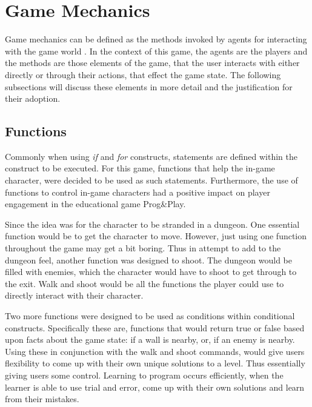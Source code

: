 \documentclass[a4paper,11.5pt]{report}
\numberwithin{figure}{section}
\numberwithin{table}{section}
\numberwithin{equation}{section}
\numberwithin{equation}{section}
\begin{document}
\section{Game Mechanics} %




Game mechanics can be defined as the methods invoked by agents for interacting with the game world \citep{sicart2008}. In the context of this game, the agents are the players and the methods are those elements of the game, that the user interacts with either directly or through their actions, that effect the game state. The following subsections will discuss these elements in more detail and the justification for their adoption.

\subsection{Functions}

Commonly when using \textit{if} and \textit{for} constructs, statements are defined within the construct to be executed. For this game, functions that help the in-game character, were decided to be used as such statements. Furthermore, the use of functions to control in-game characters had a positive impact on player engagement in the educational game Prog\&Play.

Since the idea was for the character to be stranded in a dungeon. One essential function would be to get the character to move. However, just using one function throughout the game may get a bit boring. Thus in attempt to add to the dungeon feel, another function was designed to shoot. The dungeon would be filled with enemies, which the character would have to shoot to get through to the exit. Walk and shoot would be all the functions the player could use to directly interact with their character.

Two more functions were designed to be used as conditions within conditional constructs. Specifically these are, functions that would return true or false based upon facts about the game state: if a wall is nearby, or, if an enemy is nearby. Using these in conjunction with the walk and shoot commands, would give users flexibility to come up with their own unique solutions to a level. Thus essentially giving users some control. Learning to program occurs efficiently, when the learner is able to use trial and error, come up with their own solutions and learn from their mistakes. 
\end{document}
